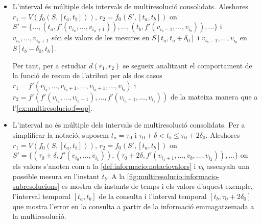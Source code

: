 \begin{itemize}
\item L'interval és múltiple dels intervals de multiresolució
  consolidats. Aleshores $r_1=V(f_0(S,[t_a,t_b]))$,
  $r_2=f_0(S',[t_a,t_b])$ on $S'= \{ \dotsc, (t_a,
  f'(v_{i_a},\dotsc,v_{i_a+1}) ), \dotsc, (t_b,
  f'(v_{i_b-1},\dotsc,v_{i_b})), \dotsc \}$ i
  $v_{i_a},\dotsc,v_{i_a+1}$ són els valors de les mesures en
  $S[t_a,t_a+\delta_0]$ i $v_{i_b-1},\dotsc,v_{i_b}$ en
  $S[t_b-\delta_0,t_b]$.

  Per tant, per a estudiar $d(r_1,r_2)$ se segueix analitzant el
  comportament de la funció de resum de l'atribut per als dos casos
  $r_1=f'(v_{i_a},\dotsc,v_{i_a+1},\dotsc, v_{i_a+1},\dotsc,v_{i_b})$
  i $r_2=f'(f'(v_{i_a},\dotsc,v_{i_a+1}),\dotsc,
  f'(v_{i_a+1},\dotsc,v_{i_b}))$ de la mateixa manera que a 
  l'\autoref{ex:multiresolucio:f=op}.


\item L'interval no és múltiple dels intervals de multiresolució
  consolidats.  Per a simplificar la notació, suposem $t_a=\tau_0$ i
  $\tau_0+\delta < t_b \leq \tau_0+2\delta_0$.  Aleshores
  $r_1=V(f_0(S,[t_a,t_b]))$, $r_2=f_0(S',[t_a,t_b])$ on $S'=
  \{(\tau_0+\delta, f'(v_{i_0},\dotsc,v_{i_1}) ),(\tau_0+2\delta ,
  f'(v_{i_1+1},\dotsc,v_{b} ,\dotsc,v_{i_2})), \dotsc \}$ on els
  valors s'anoten com a la \autoref{def:informacio:notaciovalors} i $v_b$
  assenyala una possible mesura en l'instant $t_b$.  A la
  \autoref{fig:multiresolucio:informacio-subresolucions} es mostra els
  instants de temps i els valors d'aquest exemple, l'interval
  temporal $[t_a,t_b]$ de la consulta i l'interval temporal
  $[t_b,\tau_0+2\delta_0]$ que mostra l'error en la consulta a partir
  de la informació emmagatzemada a la multiresolució.


\begin{figure}[tp]
  \centering
\end{figure}
\end{itemize}
